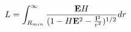 \begin{equation}
L= \int_{R_{min}}^\infty \frac{{\bf E}H}{(1-H{\bf E}^2 -\frac{{\bf 
l}^2}{r^2})^{1/2}}dr
\label{L}
\end{equation}

